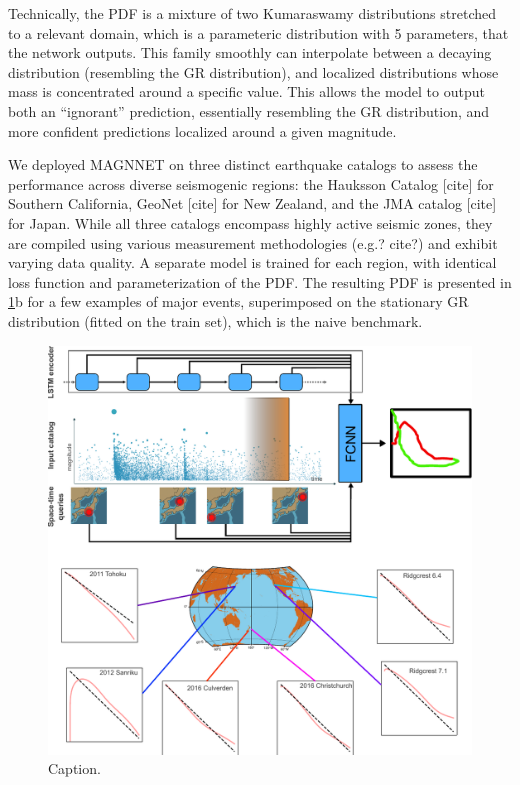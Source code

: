 \documentclass[pdflatex]{sn-jnl}
\begin{document}
Technically, the PDF is a mixture of two Kumaraswamy distributions \cite{kumaraswamy_generalized_1980} stretched to a relevant domain, which is a parameteric distribution with 5 parameters, that the network outputs. This family smoothly can interpolate between a decaying distribution (resembling the GR distribution), and localized distributions whose mass is concentrated around a specific value. This allows the model to output both an ``ignorant'' prediction, essentially resembling the GR distribution, and more confident predictions localized around a given magnitude.

We deployed MAGNNET on three distinct earthquake catalogs to assess the performance across diverse seismogenic regions: the Hauksson Catalog [cite] for Southern California, GeoNet [cite] for New Zealand, and the JMA catalog [cite] for Japan. While all three catalogs encompass highly active seismic zones, they are compiled using various measurement methodologies (e.g.? cite?) and exhibit varying data quality. A separate model is trained for each region, with identical loss function and parameterization of the PDF. The resulting PDF is presented in \ref{fig:intro_fig}b for a few examples of major events, superimposed on the stationary GR distribution (fitted on the train set), which is the naive benchmark.

\begin{figure}[h!]
	\centering
        \includegraphics[width=1\textwidth]{figures/intro_fig.pdf}
	\caption{
 Caption.
}
\label{fig:intro_fig}
\end{figure}
\end{document}
